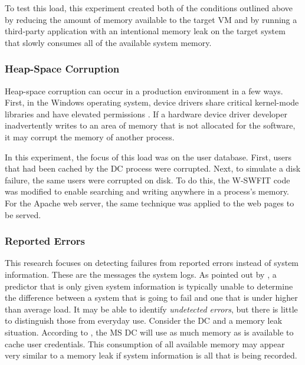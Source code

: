 To test this load, this experiment created both of the conditions outlined
above by reducing the amount of memory available to the target \ac{VM} and by
running a third-party application with an intentional memory leak on the target
system that slowly consumes all of the available system memory.

\subsubsection{Heap-Space Corruption} \label{sec:extHeapSpaceCorrupt}
Heap-space corruption can occur in a production environment in a few ways.
First, in the Windows operating system, device drivers share critical
kernel-mode libraries and have elevated permissions \citep{russinovich2009}.
If a hardware device driver developer inadvertently writes to an area of memory
that is not allocated for the software, it may corrupt the memory of another
process.

In this experiment, the focus of this load was on the user database.  First,
users that had been cached by the \ac{DC} process were corrupted.  Next, to
simulate a disk failure, the same users were corrupted on disk.  To do this,
the \ac{W-SWFIT} code was modified to enable searching and writing anywhere in
a process’s memory.  For the Apache web server, the same technique was applied
to the web pages to be served.

\subsubsection{Reported Errors} \label{sec:extReportedErrors}
This research focuses on detecting failures from reported errors instead of
system information.  These are the messages the system logs.  As pointed out by
\citet{salfnerSurvey}, a predictor that is only given system information is
typically unable to determine the difference between a system that is going to
fail and one that is under higher than average load.  It may be able to
identify \emph{undetected errors}, but there is little to distinguish those
from everyday use.  Consider the \ac{DC} and a memory leak situation.
According to \citet{russinovich2009}, the \ac{MS} \ac{DC} will use as much
memory as is available to cache user credentials.  This consumption of all
available memory may appear very similar to a memory leak if system information
is all that is being recorded.
